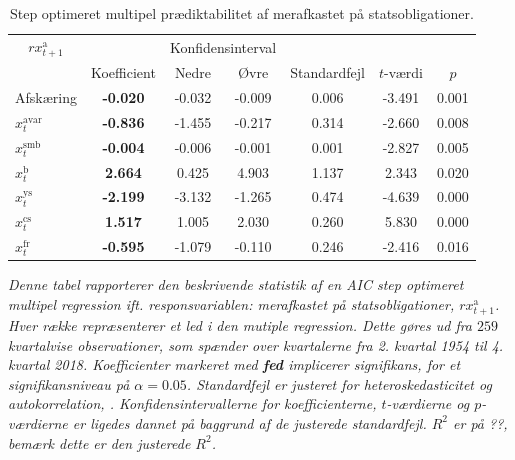 \documentclass[
  a4paper,
  oneside]{memoir}
\begin{document}
\begin{table}[H]

\caption{\label{tab:MULT-step-s}Step optimeret multipel prædiktabilitet af merafkastet på statsobligationer.}
\centering
\begin{threeparttable}
\begin{tabular}[t]{lcccccc}
\toprule
\multicolumn{1}{c}{$rx_{t+1}^{\text{a}}$} & \multicolumn{1}{c}{ } & \multicolumn{2}{c}{Konfidensinterval} & \multicolumn{3}{c}{ } \\
\cmidrule(l{3pt}r{3pt}){1-1} \cmidrule(l{3pt}r{3pt}){3-4}
  & Koefficient & Nedre & Øvre & Standardfejl & $t$-værdi & $p$\\
\midrule
\rowcolor{gray!6}  Afskæring & \textbf{-0.020} & -0.032 & -0.009 & 0.006 & -3.491 & 0.001\\
$x_t^{\text{avar}}$ & \textbf{-0.836} & -1.455 & -0.217 & 0.314 & -2.660 & 0.008\\
\rowcolor{gray!6}  $x_t^{\text{smb}}$ & \textbf{-0.004} & -0.006 & -0.001 & 0.001 & -2.827 & 0.005\\
$x_t^{\text{b}}$ & \textbf{ 2.664} & 0.425 & 4.903 & 1.137 & 2.343 & 0.020\\
\rowcolor{gray!6}  $x_t^{\text{ys}}$ & \textbf{-2.199} & -3.132 & -1.265 & 0.474 & -4.639 & 0.000\\
$x_t^{\text{cs}}$ & \textbf{ 1.517} & 1.005 & 2.030 & 0.260 & 5.830 & 0.000\\
\rowcolor{gray!6}  $x_t^{\text{fr}}$ & \textbf{-0.595} & -1.079 & -0.110 & 0.246 & -2.416 & 0.016\\
\bottomrule
\end{tabular}
\begin{tablenotes}
\item \textit{Denne tabel rapporterer den beskrivende statistik af en AIC step optimeret multipel regression ift. responsvariablen: merafkastet på statsobligationer, $rx_{t+1}^{\text{a}}$. Hver række repræsenterer et led i den mutiple regression. Dette gøres ud fra $259$ kvartalvise observationer, som spænder over kvartalerne fra 2. kvartal 1954 til 4. kvartal 2018. Koefficienter markeret med \textbf{fed} implicerer signifikans, for et signifikansniveau på $\alpha=0.05$. Standardfejl er justeret for heteroskedasticitet og autokorrelation, \citep{Newey1987}. Konfidensintervallerne for koefficienterne, $t$-værdierne og $p$-værdierne er ligedes dannet på baggrund af de justerede standardfejl. $R^2$ er på ??, bemærk dette er den justerede $R^2$.}
\end{tablenotes}
\end{threeparttable}
\end{table}
\end{document}
